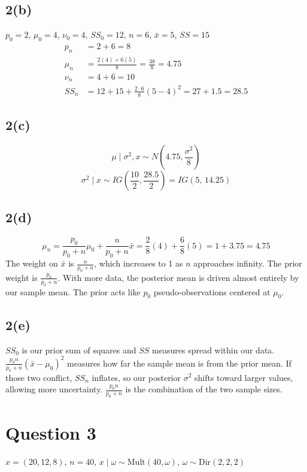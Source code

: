 \documentclass[11pt]{article}
\begin{document}
\subsection*{2(b)}
$p_0 = 2$, $\mu_0 = 4$, $\nu_0 = 4$, $SS_0 = 12$, $n = 6$, $\bar{x} = 5$, $SS = 15$
\begin{align*}
p_n &= 2 + 6 = 8 \\
\mu_n &= \frac{2(4) + 6(5)}{8} = \frac{38}{8} = 4.75 \\
\nu_n &= 4 + 6 = 10 \\
SS_n &= 12 + 15 + \frac{2\cdot 6}{8}(5-4)^2 = 27 + 1.5 = 28.5
\end{align*}

\subsection*{2(c)}
\[
\mu\mid\sigma^2,x \sim N\left(4.75,\frac{\sigma^2}{8}\right)
\]
\[
\sigma^2\mid x \sim IG\left(\frac{10}{2},\frac{28.5}{2}\right) = IG(5,\,14.25)
\]

\subsection*{2(d)}
\[
\mu_n = \frac{p_0}{p_0+n}\mu_0 + \frac{n}{p_0+n}\bar{x} = \frac{2}{8}(4) + \frac{6}{8}(5) = 1 + 3.75 = 4.75
\]
The weight on $\bar{x}$ is $\frac{n}{p_0+n}$, which increases to 1 as $n$ approaches infinity. The prior weight is $\frac{p_0}{p_0+n}$. With more data, the posterior mean is driven almost entirely by our sample mean. The prior acts like $p_0$ pseudo-observations centered at $\mu_0$.

\subsection*{2(e)}
$SS_0$ is our prior sum of squares and $SS$ measures spread within our data. $\frac{p_0 n}{p_0+n}(\bar{x}-\mu_0)^2$ measures how far the sample mean is from the prior mean. If those two conflict, $SS_n$ inflates, so our posterior $\sigma^2$ shifts toward larger values, allowing more uncertainty. $\frac{p_0 n}{p_0+n}$ is the combination of the two sample sizes.

\section*{Question 3}

$x = (20,12,8)$, \quad $n = 40$, \quad $x\mid\omega \sim \text{Mult}(40,\omega)$, \quad $\omega \sim \text{Dir}(2,2,2)$
\end{document}
